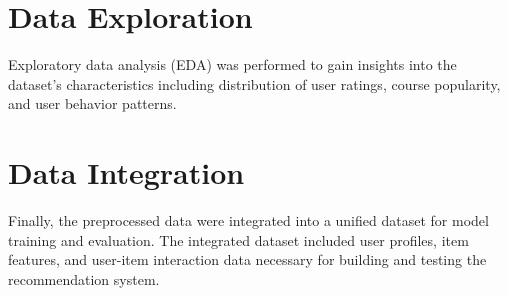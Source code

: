 \section{Data Exploration}

Exploratory data analysis (EDA) was performed to gain insights into the dataset's characteristics
including distribution of user ratings, course popularity, and user behavior patterns.

\section{Data Integration}

Finally, the preprocessed data were integrated into a unified dataset for model training and 
evaluation. The integrated dataset included user profiles, item features, and user-item 
interaction data necessary for building and testing the recommendation system.